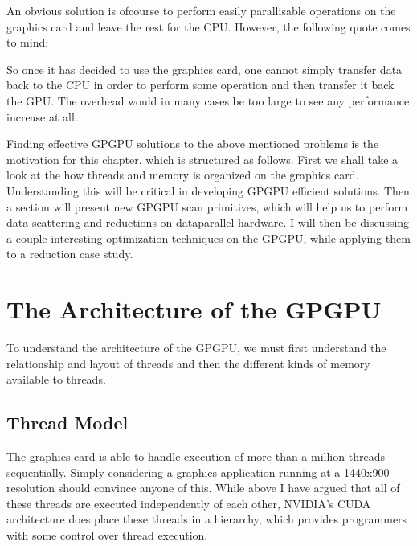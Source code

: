 
An obvious solution is ofcourse to perform easily parallisable
operations on the graphics card and leave the rest for the
CPU. However, the following quote comes to mind:


So once it has decided to use the graphics card, one cannot simply
transfer data back to the CPU in order to perform some operation and
then transfer it back the GPU. The overhead would in many cases be too
large to see any performance increase at all.




Finding effective GPGPU solutions to the above mentioned problems is
the motivation for this chapter, which is structured as follows.
First we shall take a look at the how threads and memory is organized
on the graphics card. Understanding this will be critical in
developing GPGPU efficient solutions. Then a section will present new
GPGPU scan primitives, which will help us to perform data scattering
and reductions on dataparallel hardware. I will then be discussing a
couple interesting optimization techniques on the GPGPU, while
applying them to a reduction case study.



\section{The Architecture of the GPGPU}

To understand the architecture of the GPGPU, we must first understand the
relationship and layout of threads and then the different kinds of
memory available to threads.

\subsection{Thread Model}


The graphics card is able to handle execution of more than a million
threads sequentially. Simply considering a graphics application
running at a 1440x900 resolution should convince anyone of this. While
above I have argued that all of these threads are executed
independently of each other, NVIDIA's CUDA architecture does place
these threads in a hierarchy, which provides programmers with some
control over thread execution.

